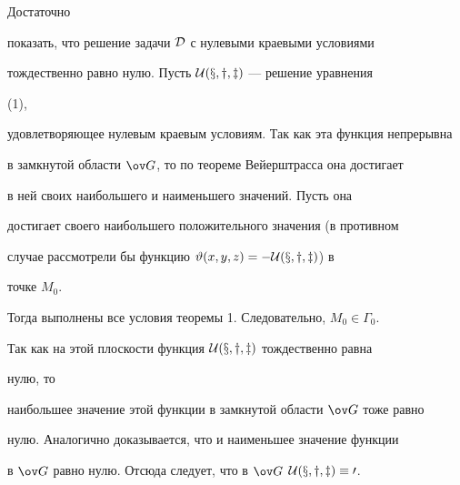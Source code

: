  


\begin{pf} 


Достаточно 


показать, что решение задачи $\cal D$ с нулевыми краевыми условиями 


тождественно равно нулю. Пусть $\cal U(x,y,z)$ --- решение уравнения 


(1),


удовлетворяющее нулевым краевым условиям. Так как эта функция непрерывна 


в замкнутой области $\ov G$, то по теореме Вейерштрасса она достигает 


в ней своих наибольшего и наименьшего значений. Пусть она 


достигает своего наибольшего положительного значения (в противном 


случае рассмотрели бы функцию $\vartheta(x,y,z)=-\cal U(x,y,z)$) в 


точке $M_0$. 


Тогда выполнены все условия теоремы 1. Следовательно, $M_0\in\Gamma_0$. 


Так как на этой плоскости функция $\cal U(x,y,z)$ тождественно равна 


нулю, то 


наибольшее значение этой функции в замкнутой области $\ov G$ тоже равно 


нулю. Аналогично доказывается, что и наименьшее значение функции 


в $\ov G$ равно нулю. Отсюда следует, что в $\ov G$\; $\cal 


U(x,y,z)\equiv0$. 


\end{pf} 


 



